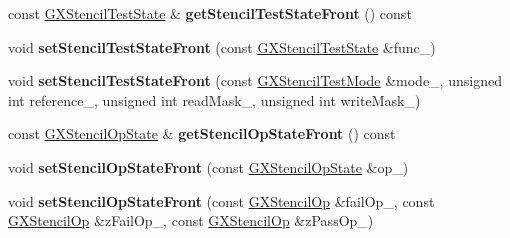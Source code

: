 \begin{DoxyCompactItemize}
\item 
const \hyperlink{class_i_dream_sky_1_1_g_x_stencil_test_state}{G\+X\+Stencil\+Test\+State} \& {\bfseries get\+Stencil\+Test\+State\+Front} () const \hypertarget{class_i_dream_sky_1_1_g_x_context_ae691ff5bc7eadf1c63b231a91e5d3771}{}\label{class_i_dream_sky_1_1_g_x_context_ae691ff5bc7eadf1c63b231a91e5d3771}

\item 
void {\bfseries set\+Stencil\+Test\+State\+Front} (const \hyperlink{class_i_dream_sky_1_1_g_x_stencil_test_state}{G\+X\+Stencil\+Test\+State} \&func\+\_\+)\hypertarget{class_i_dream_sky_1_1_g_x_context_a945895084cdbde60101f873d9749c77e}{}\label{class_i_dream_sky_1_1_g_x_context_a945895084cdbde60101f873d9749c77e}

\item 
void {\bfseries set\+Stencil\+Test\+State\+Front} (const \hyperlink{class_i_dream_sky_1_1_g_x_stencil_test_mode}{G\+X\+Stencil\+Test\+Mode} \&mode\+\_\+, unsigned int reference\+\_\+, unsigned int read\+Mask\+\_\+, unsigned int write\+Mask\+\_\+)\hypertarget{class_i_dream_sky_1_1_g_x_context_a3affefbf98251f390ae99e9cb68ce6e6}{}\label{class_i_dream_sky_1_1_g_x_context_a3affefbf98251f390ae99e9cb68ce6e6}

\item 
const \hyperlink{class_i_dream_sky_1_1_g_x_stencil_op_state}{G\+X\+Stencil\+Op\+State} \& {\bfseries get\+Stencil\+Op\+State\+Front} () const \hypertarget{class_i_dream_sky_1_1_g_x_context_a3e14cbc5c89a4a047e07835ae35be6af}{}\label{class_i_dream_sky_1_1_g_x_context_a3e14cbc5c89a4a047e07835ae35be6af}

\item 
void {\bfseries set\+Stencil\+Op\+State\+Front} (const \hyperlink{class_i_dream_sky_1_1_g_x_stencil_op_state}{G\+X\+Stencil\+Op\+State} \&op\+\_\+)\hypertarget{class_i_dream_sky_1_1_g_x_context_abdf6f61aa04e836651522b953f9549c6}{}\label{class_i_dream_sky_1_1_g_x_context_abdf6f61aa04e836651522b953f9549c6}

\item 
void {\bfseries set\+Stencil\+Op\+State\+Front} (const \hyperlink{class_i_dream_sky_1_1_g_x_stencil_op}{G\+X\+Stencil\+Op} \&fail\+Op\+\_\+, const \hyperlink{class_i_dream_sky_1_1_g_x_stencil_op}{G\+X\+Stencil\+Op} \&z\+Fail\+Op\+\_\+, const \hyperlink{class_i_dream_sky_1_1_g_x_stencil_op}{G\+X\+Stencil\+Op} \&z\+Pass\+Op\+\_\+)\hypertarget{class_i_dream_sky_1_1_g_x_context_a7153d9974cc2b13ade9b4c84f7201e79}{}\label{class_i_dream_sky_1_1_g_x_context_a7153d9974cc2b13ade9b4c84f7201e79}


\end{DoxyCompactItemize}
